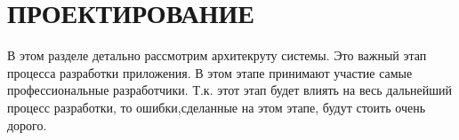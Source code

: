 \section{ПРОЕКТИРОВАНИЕ}

В этом разделе детально рассмотрим архитекруту системы.
Это важный этап процесса разработки приложения. В этом этапе принимают участие самые профессиональные разработчики. Т.к. этот этап будет влиять на весь дальнейший процесс разработки, то ошибки,сделанные на этом этапе, будут стоить очень дорого.




